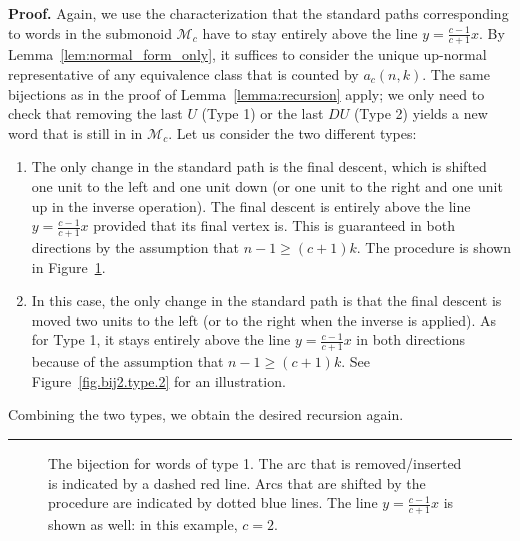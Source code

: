 \documentclass[numbers=enddot,12pt,final,onecolumn,notitlepage]{scrartcl}%
\newcommand{\red}[1]{{\color{red} #1}}
\theoremstyle{definition}
\newenvironment{proof}[1][Proof]{\noindent\textbf{#1.} }{\ \rule{0.5em}{0.5em}}
\newcommand{\M}{\mathcal{M}}
\begin{document}
\begin{proof}
Again, we use the characterization that the standard paths corresponding to words in the submonoid $\M_c$ have to stay entirely above the line $y = \frac{c-1}{c+1} x$. By Lemma~\ref{lem:normal_form_only}, it suffices to consider the unique up-normal representative of any equivalence class that is counted by $a_c(n,k)$. The same bijections as in the proof of Lemma~\ref{lemma:recursion} apply; we only need to check that removing the last $U$ (Type 1) or the last $DU$ (Type 2) yields a new word that is still in in $\M_c$. Let us consider the two different types:
\begin{enumerate}[itemindent=.7cm,label=\textbf{Type \arabic*:}]
\item The only change in the standard path is the final descent, which is shifted one unit to the left and one unit down (or one unit to the right and one unit up in the inverse operation). The final descent is entirely above the line $y = \frac{c-1}{c+1} x$ provided that its final vertex is. This is guaranteed in both directions by the assumption that $n-1 \geq (c+1)k$. The procedure is shown in Figure~\ref{fig.bij2.type.1}. 
\item In this case, the only change in the standard path is that the final descent is moved two units to the left (or to the right when the inverse is applied). As for Type 1, it stays entirely above the line $y = \frac{c-1}{c+1} x$ in both directions because of the assumption that $n-1 \geq (c+1)k$. See Figure~\ref{fig.bij2.type.2} for an illustration.
\end{enumerate}
Combining the two types, we obtain the desired recursion again.
\end{proof}

\begin{figure}[htbp]
\begin{center}
\end{center}
\caption{The bijection for words of type 1. The arc that is removed/inserted is indicated by a dashed red line. Arcs that are shifted by the procedure are indicated by dotted blue lines. The line $y = \frac{c-1}{c+1} x$ is shown as well: in this example, $c=2$.}
\label{fig.bij2.type.1}
\end{figure}
\end{document}
